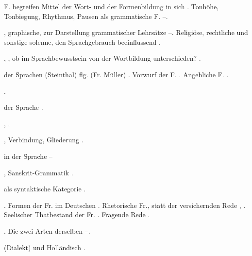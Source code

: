 \begin{register}
  F. begreifen Mittel der Wort- und der Formenbildung in sich \pageref{sp.122}. Tonhöhe, Tonbiegung, Rhythmus, Pausen als grammatische F. \pageref{sp.450}–\pageref{sp.451}.


, graphische, zur Darstellung grammatischer Lehrsätze \pageref{sp.116}–\pageref{sp.119}. Religiöse, rechtliche und sonstige solenne, den Sprachgebrauch beeinflussend \pageref{sp.245}.


, , ob im Sprachbewusstsein von der Wortbildung unterschieden? \pageref{sp.122}.


 der Sprachen (Steinthal) \pageref{sp.337} flg. (Fr. Müller) \pageref{sp.338}. Vorwurf der F. \pageref{sp.364}. Angebliche F. \pageref{sp.393}.

 \pageref{sp.147}.

 der Sprache \pageref{sp.17}.

 \pageref{sp.342}, \pageref{sp.388}.

, Verbindung, Gliederung \pageref{sp.324}.

 in der Sprache \pageref{sp.360}–\pageref{sp.365}



, Sanskrit-Grammatik \pageref{sp.26}.

 als syntaktische Kategorie \pageref{sp.104}.

. Formen der Fr. im Deutschen \pageref{sp.96}. Rhetorische Fr., statt der versichernden Rede \pageref{sp.183}, \pageref{sp.244}. Seelischer Thatbestand der Fr. \pageref{sp.310}. Fragende Rede \pageref{sp.319}.

 \pageref{sp.103}. Die zwei Arten derselben \pageref{sp.468}–\pageref{sp.469}.

 (Dialekt) und Holländisch \pageref{sp.159}.


\end{register}
